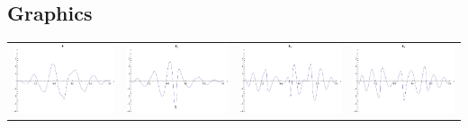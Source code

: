 \documentclass{article}
\begin{document}
\begin{landscape}
\subsection{Graphics}
\begin{tabular}{cccc}
\includegraphics[width=5.0cm]{nonic_wavelet_1.pdf}& \includegraphics[width=5.0cm]{nonic_wavelet_2.pdf}& \includegraphics[width=5.0cm]{nonic_wavelet_3.pdf}& \includegraphics[width=5.0cm]{nonic_wavelet_4.pdf} \\

\end{tabular}
\end{landscape}
\end{document}
